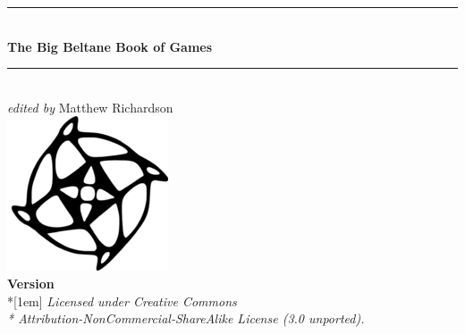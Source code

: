 \begin{titlepage}

\begin{center}


\rule{\linewidth}{0.2em}
\\[1em]
{\huge \bfseries The Big Beltane Book of Games}
\\[1em]
\rule{\linewidth}{0.2em}
\\[1em]
{\large \emph{edited by} Matthew Richardson}
\\[4em]
\includegraphics{bfslogosmall}
\\[4em]
{\large \bfseries Version }
\vfill
{\Large \cc \byncsa}\\*[1em]
\emph{Licensed under Creative Commons\\*
Attribution-NonCommercial-ShareAlike License (3.0 unported).}

\end{center}
\end{titlepage}

